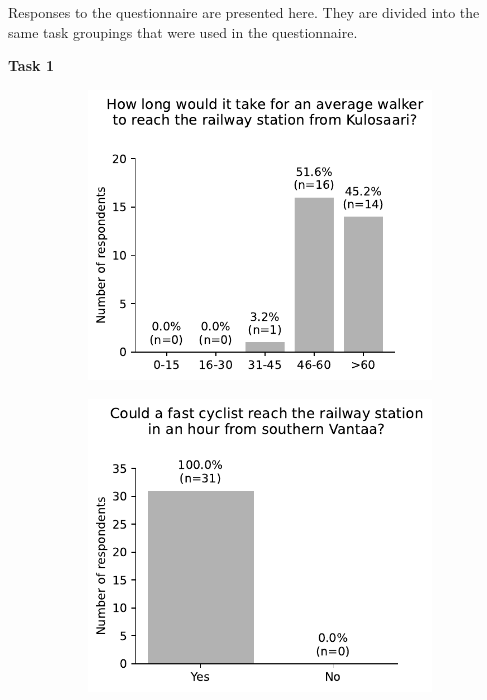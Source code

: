 \begin{appendices}
Responses to the questionnaire are presented here.
They are divided into the same task groupings that were used in the questionnaire.

\sffamily

\begin{minipage}{\textwidth}
\textbf{Task 1}

\begin{figure}[H]
	\begin{subfigure}[b]{0.5\textwidth}
		\includegraphics[width=\textwidth]{visual/figures/survey/0.pdf}
	\end{subfigure}%
	\hfill
	\begin{subfigure}[b]{0.5\textwidth}
		\includegraphics[width=\textwidth]{visual/figures/survey/1.pdf}
	\end{subfigure}%
\end{figure}
\end{minipage}


\end{appendices}
